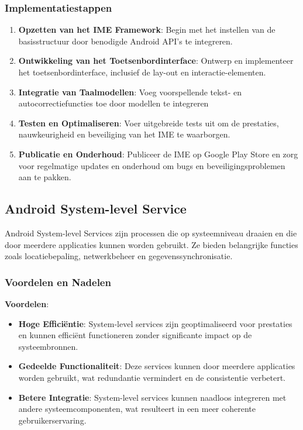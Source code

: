 \subsubsection{Implementatiestappen}

\begin{enumerate}
    \item \textbf{Opzetten van het IME Framework}: Begin met het instellen van de basisstructuur door benodigde Android API's te integreren.
    \item \textbf{Ontwikkeling van het Toetsenbordinterface}: Ontwerp en implementeer het toetsenbordinterface, inclusief de lay-out en interactie-elementen.
    \item \textbf{Integratie van Taalmodellen}: Voeg voorspellende tekst- en autocorrectiefuncties toe door modellen te integreren
    \item \textbf{Testen en Optimaliseren}: Voer uitgebreide tests uit om de prestaties, nauwkeurigheid en beveiliging van het IME te waarborgen.
    \item \textbf{Publicatie en Onderhoud}: Publiceer de IME op Google Play Store en zorg voor regelmatige updates en onderhoud om bugs en beveiligingsproblemen aan te pakken.
\end{enumerate}

\subsection{Android System-level Service}

Android System-level Services zijn processen die op systeemniveau draaien en die door meerdere applicaties kunnen worden gebruikt. Ze bieden belangrijke functies zoals locatiebepaling, netwerkbeheer en gegevenssynchronisatie.

\subsubsection{Voordelen en Nadelen}

\textbf{Voordelen}:
\begin{itemize}
    \item \textbf{Hoge Efficiëntie}: System-level services zijn geoptimaliseerd voor prestaties en kunnen efficiënt functioneren zonder significante impact op de systeembronnen.
    \item \textbf{Gedeelde Functionaliteit}: Deze services kunnen door meerdere applicaties worden gebruikt, wat redundantie vermindert en de consistentie verbetert.
    \item \textbf{Betere Integratie}: System-level services kunnen naadloos integreren met andere systeemcomponenten, wat resulteert in een meer coherente gebruikerservaring.
\end{itemize}

